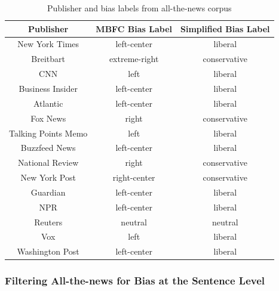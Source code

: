 \documentclass[10pt,a4paper,onecolumn]{article}
\begin{document}
\begin{table}[h!]
	\begin{center}
		\caption{Publisher and bias labels from all-the-news corpus}
		\label{tab:pub-bias}
		\begin{tabular}{c|c|c}
			\hline\hline
			\textbf{Publisher} & \textbf{MBFC Bias Label} & \textbf{Simplified Bias Label} \\
			\hline
			New York Times & left-center & liberal \\
			\rowcolor{Gray}
			Breitbart & extreme-right & conservative \\
			\rowcolor{Gray}
			CNN & left & liberal \\
			Business Insider & left-center & liberal \\
			Atlantic & left-center & liberal \\
			\rowcolor{Gray}
			Fox News & right & conservative \\
			\rowcolor{Gray}
			Talking Points Memo & left & liberal \\
			Buzzfeed News & left-center & liberal \\
			National Review & right & conservative \\
			New York Post & right-center & conservative \\
			Guardian & left-center & liberal \\
			NPR & left-center & liberal \\
			Reuters & neutral & neutral \\
			\rowcolor{Gray}
			Vox & left & liberal \\
			Washington Post & left-center & liberal \\
			\hline\hline
		\end{tabular}
	\end{center}
\end{table}

\subsubsection{Filtering All-the-news for Bias at the Sentence Level}
\label{sec:filtering2}
\end{document}
